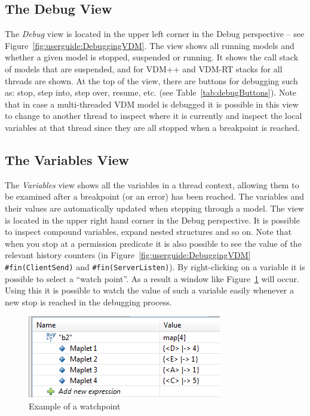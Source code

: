 \documentclass{overturerepchap}
\begin{document}
\subsection{The Debug View}

The \emph{Debug} view is located in the upper left corner in the Debug perspective --
see Figure~\ref{fig:userguide:DebuggingVDM}. The view shows all running
models and whether a given model is stopped, suspended or running.
It shows the call stack of models that are suspended, and for VDM++ and VDM-RT stacks
for all threads are shown.
At the top of the view, there are buttons
for debugging such as: stop, step into, step over, resume, etc. (see
Table~\ref{tab:debugButtons}). Note that in case a multi-threaded VDM
model is debugged it is possible in this view to change to another
thread to inspect where it is currently and inspect the local
variables at that thread since they are all stopped when a breakpoint
is reached.

\subsection{The Variables View}

The \emph{Variables} view shows all the variables in a thread context, allowing them to be
examined after a breakpoint (or an error) has been reached. The variables and their values are
automatically updated when stepping through a model. The view is
located in the upper right hand corner in the Debug perspective. It is
possible to inspect compound variables, expand nested structures and
so on. Note that when you stop at a permission predicate it is also
possible to see the value of the relevant history counters (in
Figure~\ref{fig:userguide:DebuggingVDM} \texttt{\#fin(ClientSend)} and
\texttt{\#fin(ServerListen)}). By right-clicking on a variable it is
possible to select a ``watch point''. As a result a window like
Figure~\ref{fig:watchpoint} will occur. Using this it is possible to
watch the value of such a variable easily whenever a new stop is
reached in the debugging process.

\begin{figure}[htp]
\begin{center}
  \includegraphics[width=.5\textwidth]{screenDumps/watchpoint}
  \caption{Example of a watchpoint}
  \label{fig:watchpoint}
\end{center}
\end{figure}
\end{document}
